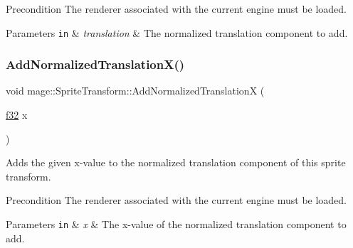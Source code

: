 \begin{DoxyPrecond}{Precondition}
The renderer associated with the current engine must be loaded. 
\end{DoxyPrecond}

\begin{DoxyParams}[1]{Parameters}
\mbox{\tt in}  & {\em translation} & The normalized translation component to add. \\
\hline
\end{DoxyParams}
\hypertarget{structmage_1_1_sprite_transform_abee63fe292c6575d4a4619d6b8c1889b}{}\label{structmage_1_1_sprite_transform_abee63fe292c6575d4a4619d6b8c1889b} 
\subsubsection{\texorpdfstring{Add\+Normalized\+Translation\+X()}{AddNormalizedTranslationX()}}
{\footnotesize\ttfamily void mage\+::\+Sprite\+Transform\+::\+Add\+Normalized\+TranslationX (\begin{DoxyParamCaption}\item[{\hyperlink{namespacemage_a6a44ad388483959dc4dff9f2aef91431}{f32}}]{x }\end{DoxyParamCaption})}

Adds the given x-\/value to the normalized translation component of this sprite transform.

\begin{DoxyPrecond}{Precondition}
The renderer associated with the current engine must be loaded. 
\end{DoxyPrecond}

\begin{DoxyParams}[1]{Parameters}
\mbox{\tt in}  & {\em x} & The x-\/value of the normalized translation component to add. \\
\hline
\end{DoxyParams}
\hypertarget{structmage_1_1_sprite_transform_aec164640612557f5be98b028b9d6c484}{}\label{structmage_1_1_sprite_transform_aec164640612557f5be98b028b9d6c484} 
